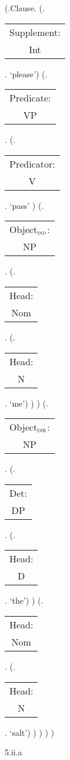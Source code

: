 \documentclass[12pt,letterpaper]{article}
\begin{document}
\begin{figure}
	\begin{center}
		\begin{parsetree}
			(.Clause.
			(.\begin{tabular}{c}Supplement:\\Int\end{tabular}. `please')
			(.\begin{tabular}{c}Predicate:\\VP\end{tabular}.
			(.\begin{tabular}{c}Predicator:\\V\end{tabular}.    `pass' )
			(.\begin{tabular}{c}Object$_\textsc{ind}$:\\NP\end{tabular}.
			(.\begin{tabular}{c}Head:\\Nom\end{tabular}.
			(.\begin{tabular}{c}Head:\\N\end{tabular}. `me')
			)
			)
			(.\begin{tabular}{c}Object$_\textsc{dir}$:\\NP\end{tabular}.
			(.\begin{tabular}{c}Det:\\DP\end{tabular}.
				(.\begin{tabular}{c}Head:\\D\end{tabular}. `the')
			)
			(.\begin{tabular}{c}Head:\\Nom\end{tabular}.
			(.\begin{tabular}{c}Head:\\N\end{tabular}. `salt')
			)
			)
			)
			)
			
			\hfill \break\hfill \break
		\end{parsetree}
		5.ii.a
	\end{center}
\end{figure}
\end{document}
